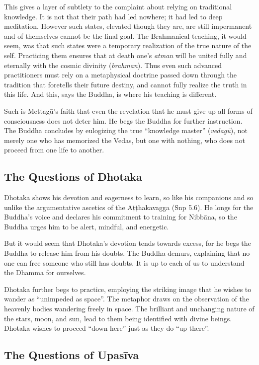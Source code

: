\documentclass[12pt,openany]{book}%
\begin{document}
This gives a layer of subtlety to the complaint about relying on traditional knowledge. It is not that their path had led nowhere; it had led to deep meditation. However such states, elevated though they are, are still impermanent and of themselves cannot be the final goal. The Brahmanical teaching, it would seem, was that such states were a temporary realization of the true nature of the self. Practicing them ensures that at death one’s \textit{atman} will be united fully and eternally with the cosmic divinity (\textit{brahman}). Thus even such advanced practitioners must rely on a metaphysical doctrine passed down through the tradition that foretells their future destiny, and cannot fully realize the truth in this life. And this, says the Buddha, is where his teaching is different.

Such is \textsanskrit{Mettagū}’s faith that even the revelation that he must give up all forms of consciousness does not deter him. He begs the Buddha for further instruction. The Buddha concludes by eulogizing the true “knowledge master” (\textit{\textsanskrit{vedagū}}), not merely one who has memorized the Vedas, but one with nothing, who does not proceed from one life to another.

\subsection*{The Questions of Dhotaka}

Dhotaka shows his devotion and eagerness to learn, so like his companions and so unlike the argumentative ascetics of the \textsanskrit{Aṭṭhakavagga} (Snp 5.6). He longs for the Buddha’s voice and declares his commitment to training for \textsanskrit{Nibbāna}, so the Buddha urges him to be alert, mindful, and energetic.

But it would seem that Dhotaka’s devotion tends towards excess, for he begs the Buddha to release him from his doubts. The Buddha demurs, explaining that no one can free someone who still has doubts. It is up to each of us to understand the Dhamma for ourselves.

Dhotaka further begs to practice, employing the striking image that he wishes to wander as “unimpeded as space”. The metaphor draws on the observation of the heavenly bodies wandering freely in space. The brilliant and unchanging nature of the stars, moon, and sun, lead to them being identified with divine beings. Dhotaka wishes to proceed “down here” just as they do “up there”.

\subsection*{The Questions of \textsanskrit{Upasīva}}
\end{document}
